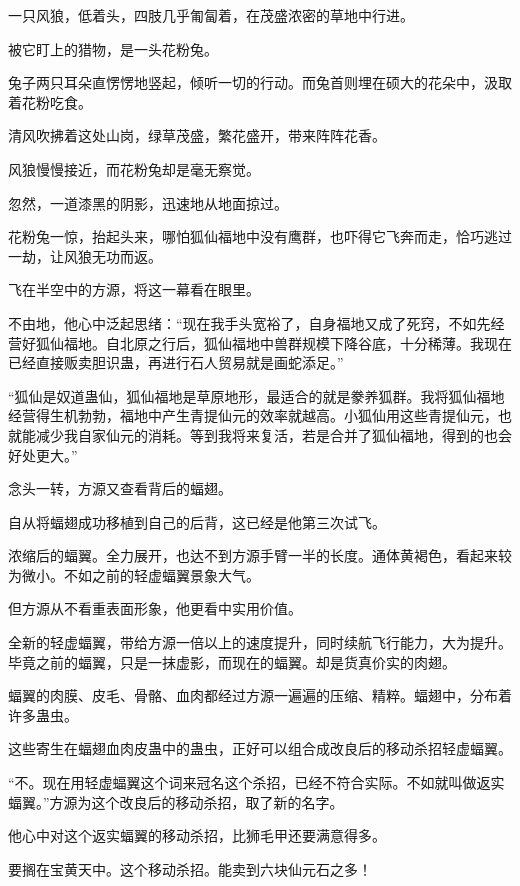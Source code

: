 
\begin{this_body}

一只风狼，低着头，四肢几乎匍匐着，在茂盛浓密的草地中行进。

被它盯上的猎物，是一头花粉兔。

兔子两只耳朵直愣愣地竖起，倾听一切的行动。而兔首则埋在硕大的花朵中，汲取着花粉吃食。

清风吹拂着这处山岗，绿草茂盛，繁花盛开，带来阵阵花香。

风狼慢慢接近，而花粉兔却是毫无察觉。

忽然，一道漆黑的阴影，迅速地从地面掠过。

花粉兔一惊，抬起头来，哪怕狐仙福地中没有鹰群，也吓得它飞奔而走，恰巧逃过一劫，让风狼无功而返。

飞在半空中的方源，将这一幕看在眼里。

不由地，他心中泛起思绪：“现在我手头宽裕了，自身福地又成了死窍，不如先经营好狐仙福地。自北原之行后，狐仙福地中兽群规模下降谷底，十分稀薄。我现在已经直接贩卖胆识蛊，再进行石人贸易就是画蛇添足。”

“狐仙是奴道蛊仙，狐仙福地是草原地形，最适合的就是豢养狐群。我将狐仙福地经营得生机勃勃，福地中产生青提仙元的效率就越高。小狐仙用这些青提仙元，也就能减少我自家仙元的消耗。等到我将来复活，若是合并了狐仙福地，得到的也会好处更大。”

念头一转，方源又查看背后的蝠翅。

自从将蝠翅成功移植到自己的后背，这已经是他第三次试飞。

浓缩后的蝠翼。全力展开，也达不到方源手臂一半的长度。通体黄褐色，看起来较为微小。不如之前的轻虚蝠翼景象大气。

但方源从不看重表面形象，他更看中实用价值。

全新的轻虚蝠翼，带给方源一倍以上的速度提升，同时续航飞行能力，大为提升。毕竟之前的蝠翼，只是一抹虚影，而现在的蝠翼。却是货真价实的肉翅。

蝠翼的肉膜、皮毛、骨骼、血肉都经过方源一遍遍的压缩、精粹。蝠翅中，分布着许多蛊虫。

这些寄生在蝠翅血肉皮蛊中的蛊虫，正好可以组合成改良后的移动杀招轻虚蝠翼。

“不。现在用轻虚蝠翼这个词来冠名这个杀招，已经不符合实际。不如就叫做返实蝠翼。”方源为这个改良后的移动杀招，取了新的名字。

他心中对这个返实蝠翼的移动杀招，比狮毛甲还要满意得多。

要搁在宝黄天中。这个移动杀招。能卖到六块仙元石之多！


\end{this_body}
